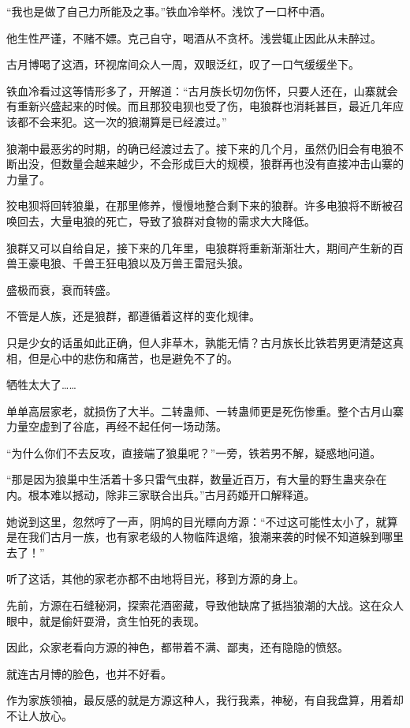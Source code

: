 \begin{this_body}
“我也是做了自己力所能及之事。”铁血冷举杯。浅饮了一口杯中酒。

他生性严谨，不赌不嫖。克己自守，喝酒从不贪杯。浅尝辄止因此从未醉过。

古月博喝了这酒，环视席间众人一周，双眼泛红，叹了一口气缓缓坐下。

铁血冷看过这等情形多了，开解道：“古月族长切勿伤怀，只要人还在，山寨就会有重新兴盛起来的时候。而且那狡电狈也受了伤，电狼群也消耗甚巨，最近几年应该都不会来犯。这一次的狼潮算是已经渡过。”

狼潮中最恶劣的时期，的确已经渡过去了。接下来的几个月，虽然仍旧会有电狼不断出没，但数量会越来越少，不会形成巨大的规模，狼群再也没有直接冲击山寨的力量了。

狡电狈将回转狼巢，在那里修养，慢慢地整合剩下来的狼群。许多电狼将不断被召唤回去，大量电狼的死亡，导致了狼群对食物的需求大大降低。

狼群又可以自给自足，接下来的几年里，电狼群将重新渐渐壮大，期间产生新的百兽王豪电狼、千兽王狂电狼以及万兽王雷冠头狼。

盛极而衰，衰而转盛。

不管是人族，还是狼群，都遵循着这样的变化规律。

只是少女的话虽如此正确，但人非草木，孰能无情？古月族长比铁若男更清楚这真相，但是心中的悲伤和痛苦，也是避免不了的。

牺牲太大了……

单单高层家老，就损伤了大半。二转蛊师、一转蛊师更是死伤惨重。整个古月山寨力量空虚到了谷底，再经不起任何一场动荡。

“为什么你们不去反攻，直接端了狼巢呢？”一旁，铁若男不解，疑惑地问道。

“那是因为狼巢中生活着十多只雷气虫群，数量近百万，有大量的野生蛊夹杂在内。根本难以撼动，除非三家联合出兵。”古月药姬开口解释道。

她说到这里，忽然哼了一声，阴鸠的目光瞟向方源：“不过这可能性太小了，就算是在我们古月一族，也有家老级的人物临阵退缩，狼潮来袭的时候不知道躲到哪里去了！”

听了这话，其他的家老亦都不由地将目光，移到方源的身上。

先前，方源在石缝秘洞，探索花酒密藏，导致他缺席了抵挡狼潮的大战。这在众人眼中，就是偷奸耍滑，贪生怕死的表现。

因此，众家老看向方源的神色，都带着不满、鄙夷，还有隐隐的愤怒。

就连古月博的脸色，也并不好看。

作为家族领袖，最反感的就是方源这种人，我行我素，神秘，有自我盘算，用着却不让人放心。


\end{this_body}
